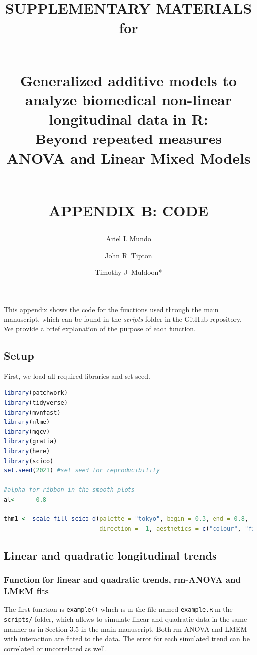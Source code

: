 \documentclass[
]{article}
\author{Ariel I. Mundo \orcidaffila{}}
\author{John R. Tipton \orcidaffilb{}}
\author{Timothy J. Muldoon*}
\affil{tmuldoon@uark.edu}
\title{SUPPLEMENTARY MATERIALS for\\
\strut \\
\textbf{Generalized additive models to analyze biomedical non-linear longitudinal data in R:}\\
Beyond repeated measures ANOVA and Linear Mixed Models\\
\strut \\
APPENDIX B: CODE}
\author{}
\date{\vspace{-2.5em}}
\newcommand{\passthrough}[1]{#1}
\begin{document}
\maketitle

\newpage


This appendix shows the code for the functions used through the main manuscript, which can be found in the \emph{scripts} folder in the GitHub repository. We provide a brief explanation of the purpose of each function.

\hypertarget{setup}{%
\subsection{Setup}\label{setup}}

First, we load all required libraries and set seed.

\begin{lstlisting}[language=R]
library(patchwork)
library(tidyverse)
library(mvnfast)
library(nlme)
library(mgcv)
library(gratia)
library(here)
library(scico)
set.seed(2021) #set seed for reproducibility

#alpha for ribbon in the smooth plots
al<-     0.8

thm1 <- scale_fill_scico_d(palette = "tokyo", begin = 0.3, end = 0.8,
                           direction = -1, aesthetics = c("colour", "fill"))
\end{lstlisting}

\hypertarget{linear-and-quadratic-longitudinal-trends}{%
\subsection{Linear and quadratic longitudinal trends}\label{linear-and-quadratic-longitudinal-trends}}

\hypertarget{function-for-linear-and-quadratic-trends-rm-anova-and-lmem-fits}{%
\subsubsection{Function for linear and quadratic trends, rm-ANOVA and LMEM fits}\label{function-for-linear-and-quadratic-trends-rm-anova-and-lmem-fits}}

The first function is \passthrough{\lstinline!example()!} which is in the file named \passthrough{\lstinline!example.R!} in the \passthrough{\lstinline!scripts/!} folder, which allows to simulate linear and quadratic data in the same manner as in Section 3.5 in the main manuscript. Both rm-ANOVA and LMEM with interaction are fitted to the data. The error for each simulated trend can be correlated or uncorrelated as well.
\end{document}

